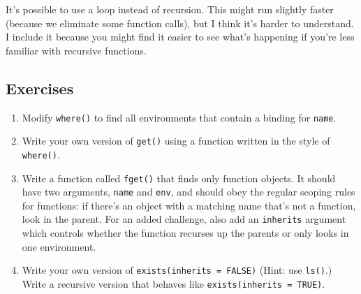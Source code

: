 \begin{shortbox}

It's possible to use a loop instead of recursion. This might run
slightly faster (because we eliminate some function calls), but I think
it's harder to understand. I include it because you might find it easier
to see what's happening if you're less familiar with recursive
functions.

\begin{Shaded}
\begin{Highlighting}[]
\StringTok{ }\NormalTok{())}

\StringTok{ } \NormalTok{()) \{}
      \NormalTok{()}
    \NormalTok{\}}
    \StringTok{ }
  \NormalTok{\}}

\NormalTok{\}}
\end{Highlighting}
\end{Shaded}

\end{shortbox}

\subsection{Exercises}

\begin{enumerate}
\def\labelenumi{\arabic{enumi}.}
\item
  Modify \texttt{where()} to find all environments that contain a
  binding for \texttt{name}.
\item
  Write your own version of \texttt{get()} using a function written in
  the style of \texttt{where()}.
\item
  Write a function called \texttt{fget()} that finds only function
  objects. It should have two arguments, \texttt{name} and \texttt{env},
  and should obey the regular scoping rules for functions: if there's an
  object with a matching name that's not a function, look in the parent.
  For an added challenge, also add an \texttt{inherits} argument which
  controls whether the function recurses up the parents or only looks in
  one environment.
\item
  Write your own version of \texttt{exists(inherits = FALSE)} (Hint: use
  \texttt{ls()}.) Write a recursive version that behaves like
  \texttt{exists(inherits = TRUE)}.
\end{enumerate}

